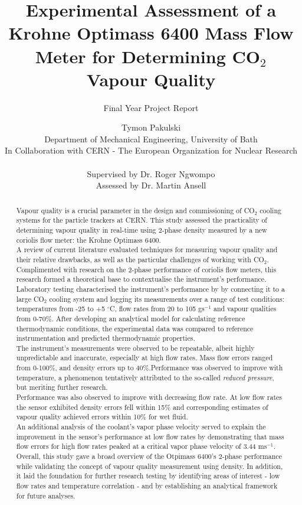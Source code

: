\documentclass{report}
\author{Tymon Pakulski\\Department of Mechanical Engineering, University of Bath\\In Collaboration with CERN - The European Organization for Nuclear Research \\\\ Supervised by Dr. Roger Ngwompo\\Assessed by Dr. Martin Ansell}
\title{Experimental Assessment of a Krohne Optimass 6400 Mass Flow Meter for Determining CO$_2$ Vapour Quality}
\subtitle{Final Year Project Report}
\begin{document}
\graphicspath{{figures/}}

\maketitle
{}
\begin{abstract}
Vapour quality is a crucial parameter in the design and commissioning of CO$_2$ cooling systems for the particle trackers at CERN. This study assessed the practicality of determining vapour quality in real-time using 2-phase density measured by a new coriolis flow meter: the Krohne Optimass 6400.\\ A review of current literature evaluated techniques for measuring vapour quality and their relative drawbacks, as well as the particular challenges of working with CO$_2$. Complimented with research on the 2-phase performance of coriolis flow meters, this research formed a theoretical base to contextualise the instrument's performance.\\Laboratory testing characterised the instrument's performance by by connecting it to a large CO$_2$ cooling system and logging its measurements over a range of test conditions: temperatures from -25 to +5 $^\circ$C, flow rates from 20 to 105 gs$^{-1}$ and vapour qualities from 0-70\%. After developing an analytical model for calculating reference thermodynamic conditions, the experimental data was compared to reference instrumentation and predicted thermodynamic properties.\\ The instrument's measurements were observed to be repeatable, albeit highly unpredictable and inaccurate, especially at high flow rates.  Mass flow errors ranged from 0-100\%, and density errors up to 40\%.Performance was observed to improve with temperature, a phenomenon tentatively attributed to the so-called \textit{reduced pressure}, but meriting further research.\\ Performance was also observed to improve with decreasing flow rate. At low flow rates the sensor exhibited density errors fell within 15\% and corresponding estimates of vapour quality achieved errors within 10\% for wet fluid. \\ An additional analysis of the coolant's vapor phase velocity served to explain the improvement in the sensor's performance at low flow rates by demonstrating that mass flow errors for high flow rates peaked at a critical vapor phase velocity of 3.44 ms$^{-1}$.\\ Overall, this study gave a broad overview of the Otpimass 6400's 2-phase performance while validating the concept of vapour quality measurement using density. In addition, it laid the foundation for further research testing by identifying areas of interest - low flow rates and temperature correlation - and by establishing an analytical framework for future analyses.
\end{abstract}
\end{document}
